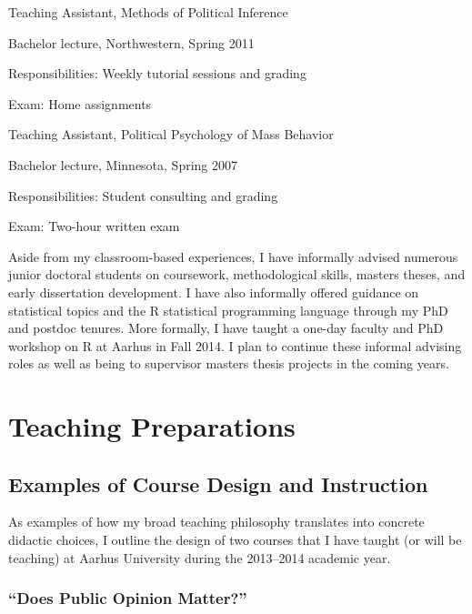 \documentclass[12pt]{article}
\begin{document}
\begin{itemize*}
\begin{itemize*}
	\end{itemize*}
\item Teaching Assistant, Methods of Political Inference
	\begin{itemize*}
	\item Bachelor lecture, Northwestern, Spring 2011
	\item Responsibilities: Weekly tutorial sessions and grading
	\item Exam: Home assignments
	\end{itemize*}
\item Teaching Assistant, Political Psychology of Mass Behavior
	\begin{itemize*}
	\item Bachelor lecture, Minnesota, Spring 2007
	\item Responsibilities: Student consulting and grading
	\item Exam: Two-hour written exam
	\end{itemize*}
\end{itemize*}

Aside from my classroom-based experiences, I have informally advised numerous junior doctoral students on coursework, methodological skills, masters theses, and early dissertation development. I have also informally offered guidance on statistical topics and the R statistical programming language through my PhD and postdoc tenures. More formally, I have taught a one-day faculty and PhD workshop on R at Aarhus in Fall 2014. I plan to continue these informal advising roles as well as being to supervisor masters thesis projects in the coming years.

\clearpage
\section{Teaching Preparations}



\subsection{Examples of Course Design and Instruction}

As examples of how my broad teaching philosophy translates into concrete didactic choices, I outline the design of two courses that I have taught (or will be teaching) at Aarhus University during the 2013--2014 academic year. 

\subsubsection{``Does Public Opinion Matter?''}
\end{document}

